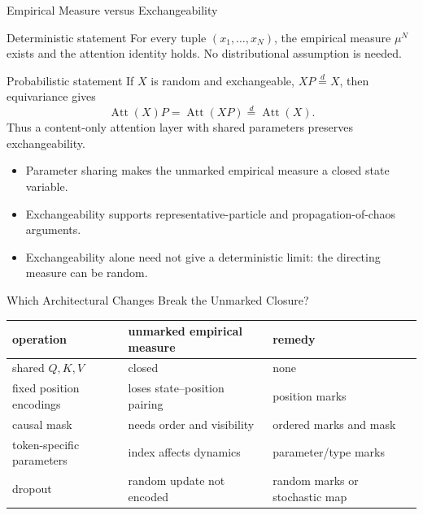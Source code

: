 \documentclass[aspectratio=169,11pt]{beamer}
\DeclareMathOperator{\Att}{Att}
\begin{document}
\begin{frame}{Empirical Measure versus Exchangeability}
\small
\begin{block}{Deterministic statement}
For every tuple $(x_1,\ldots,x_N)$, the empirical measure $\mu^N$ exists and the attention identity holds.  No distributional assumption is needed.
\end{block}

\begin{exampleblock}{Probabilistic statement}
If $X$ is random and exchangeable, $XP\stackrel{d}=X$, then equivariance gives
\[
 \Att(X)P=\Att(XP)\stackrel{d}=\Att(X).
\]
Thus a content-only attention layer with shared parameters preserves exchangeability.
\end{exampleblock}

\begin{itemize}
\item Parameter sharing makes the unmarked empirical measure a closed state variable.
\item Exchangeability supports representative-particle and propagation-of-chaos arguments.
\item Exchangeability alone need not give a deterministic limit: the directing measure can be random.
\end{itemize}
\end{frame}

\begin{frame}{Which Architectural Changes Break the Unmarked Closure?}
\begin{center}
\begin{tabular}{p{}|p{}|p{}}
operation & unmarked empirical measure & remedy \\
\hline
shared $Q,K,V$ & closed & none \\
fixed position encodings & loses state--position pairing & position marks \\
causal mask & needs order and visibility & ordered marks and mask \\
token-specific parameters & index affects dynamics & parameter/type marks \\
dropout & random update not encoded & random marks or stochastic map
\end{tabular}
\end{center}


\end{frame}
\end{document}
